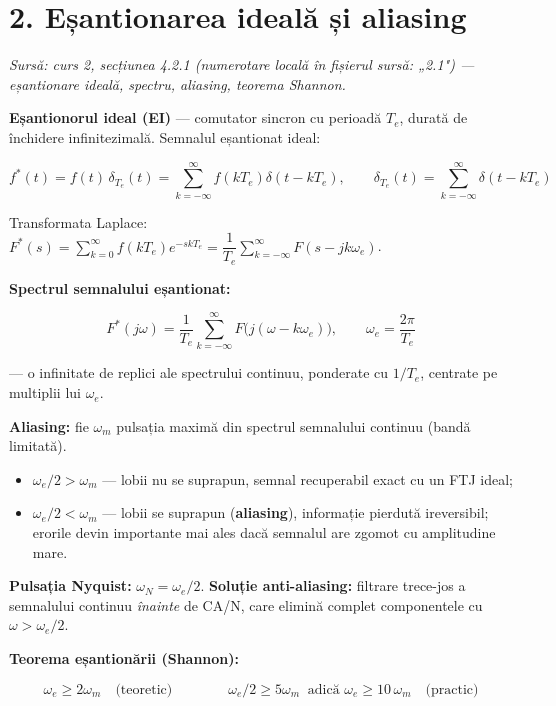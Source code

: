 \documentclass[10pt,a4paper]{article}
\newcommand{\srcnote}[1]{{\footnotesize\color{gray!55!black}\textit{Sursă: #1}}\par}
\begin{document}
\section*{2. Eșantionarea ideală și aliasing}\label{sec:2}
\srcnote{curs 2, secțiunea 4.2.1 (numerotare locală în fișierul sursă: „2.1") — eșantionare ideală, spectru, aliasing, teorema Shannon.}
\textbf{Eșantionorul ideal (EI)} — comutator sincron cu perioadă $T_e$, durată de închidere infinitezimală. Semnalul eșantionat ideal:
\begin{keyeq}\color{red!65!black}
$$f^*(t)=f(t)\,\delta_{T_e}(t)=\sum_{k=-\infty}^{\infty}f(kT_e)\delta(t-kT_e),\qquad \delta_{T_e}(t)=\sum_{k=-\infty}^{\infty}\delta(t-kT_e)$$
\end{keyeq}
Transformata Laplace: $F^*(s)=\sum_{k=0}^{\infty}f(kT_e)e^{-skT_e}=\dfrac{1}{T_e}\sum_{k=-\infty}^{\infty}F(s-jk\omega_e)$.

\textbf{Spectrul semnalului eșantionat:}
\begin{keyeq}\color{red!65!black}
$$F^*(j\omega)=\dfrac{1}{T_e}\sum_{k=-\infty}^{\infty}F\big(j(\omega-k\omega_e)\big),\qquad \omega_e=\dfrac{2\pi}{T_e}$$
\end{keyeq}
— o infinitate de replici ale spectrului continuu, ponderate cu $1/T_e$, centrate pe multiplii lui $\omega_e$.

\textbf{Aliasing:} fie $\omega_m$ pulsația maximă din spectrul semnalului continuu (bandă limitată).
\begin{itemize}
\item $\omega_e/2>\omega_m$ — lobii nu se suprapun, semnal recuperabil exact cu un FTJ ideal;
\item $\omega_e/2<\omega_m$ — lobii se suprapun (\textbf{aliasing}), informație pierdută ireversibil; erorile devin importante mai ales dacă semnalul are zgomot cu amplitudine mare.
\end{itemize}
\textbf{Pulsația Nyquist:} $\omega_N=\omega_e/2$. \textbf{Soluție anti-aliasing:} filtrare trece-jos a semnalului continuu \emph{înainte} de CA/N, care elimină complet componentele cu $\omega>\omega_e/2$.

\textbf{Teorema eșantionării (Shannon):}
\begin{keyeq}\color{red!65!black}
$$\omega_e\ge 2\omega_m \quad\text{(teoretic)}\qquad\qquad \omega_e/2\ge 5\omega_m\ \text{ adică } \omega_e\ge 10\,\omega_m\quad\text{(practic)}$$
\end{keyeq}
\end{document}
